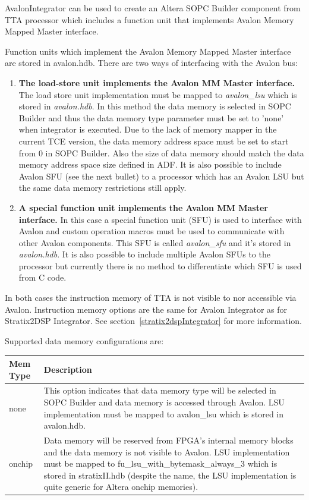 \documentclass[twoside]{tceusermanual}
\begin{document}
AvalonIntegrator can be used to create an Altera SOPC Builder component from
TTA processor which includes a function unit that implements Avalon Memory
Mapped Master interface.

Function units which implement the Avalon Memory Mapped Master interface are stored
in avalon.hdb. There are two ways of interfacing with the Avalon bus:

\begin{enumerate}
 \item \textbf{The load-store unit implements the Avalon MM Master interface.} 
The load store unit implementation must be mapped to \textit{avalon\_lsu} which is 
stored in \textit{avalon.hdb}. In this method the data memory is selected in SOPC Builder and thus
the data memory type parameter must be set to 'none' when integrator is
executed. Due to the lack of memory mapper in the current TCE version, 
the data memory address space must be set to start from 0 in SOPC Builder. Also the size of
data memory should match the data memory address space size defined in ADF.
It is also possible to include Avalon SFU (see the next bullet) to a processor
which has an Avalon LSU but the same data memory restrictions still apply.

 \item \textbf{A special function unit implements the Avalon MM Master interface.}
In this case a special function unit (SFU) is used to interface with Avalon and
custom operation macros must be used to communicate with other Avalon components.
This SFU is called \textit{avalon\_sfu} and it's stored in \textit{avalon.hdb}.
It is also possible to include multiple Avalon SFUs to the processor but
currently there is no method to differentiate which SFU is used from C code.


\end{enumerate}

In both cases the instruction memory of TTA is not visible to nor accessible
via Avalon. Instruction memory options are the same for Avalon Integrator as
for Stratix2DSP Integrator. See section~\ref{stratix2dspIntegrator} for more
information.

Supported data memory configurations are:
\begin{center}
\begin{longtable}[htb]{@{}p{}%
                     @{}p{}}

\textbf{Mem Type} &\textbf{Description} \\
\hline
none & This option indicates that data memory type will be selected in SOPC
Builder and data memory is accessed through Avalon. LSU implementation must
be mapped to avalon\_lsu which is stored in avalon.hdb.\\
onchip & Data memory will be reserved from FPGA's internal memory blocks and
the data memory is not visible to Avalon. LSU implementation must be mapped to
fu\_lsu\_with\_bytemask\_always\_3 which is stored in stratixII.hdb (despite
the name, the LSU implementation is quite generic for Altera onchip memories).
\end{longtable}
\end{center}
\end{document}
